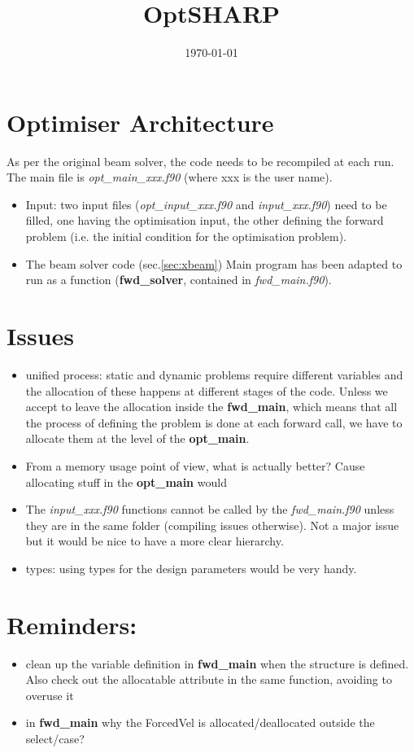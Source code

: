 \documentclass[a4paper,10pt]{article}
\title{OptSHARP}
\date{\today}
\newcommand{\bit}{\begin{itemize}}
\newcommand{\eit}{\end{itemize}}
\newcommand{\ffile}[1]{\textsl{{#1}.f90}} %
\newcommand{\ffun}[1]{\textbf{{#1}}}  %
\begin{document}
\maketitle



\section{Optimiser Architecture}
As per the original beam solver, the code needs to be recompiled at each run. The main file is \ffile{opt\_main\_xxx} (where xxx is the user name).
\bit
\item Input: two input files (\ffile{opt\_input\_xxx} and \ffile{input\_xxx}) need to be filled, one having the optimisation input, the other defining the forward problem (i.e. the initial condition for the optimisation problem).

\item The beam solver code (sec.\ref{sec:xbeam}) Main program has been adapted to run as a function (\ffun{fwd\_solver}, contained in \ffile{fwd\_main}). 


\eit



\section{Issues}
\bit
\item unified process: static and dynamic problems require different variables and the allocation of these happens at different stages of the code. Unless we accept to leave the allocation inside the \ffun{fwd\_main}, which means that all the process of defining the problem is done at each forward call, we have to allocate them at the level of the \ffun{opt\_main}.
\item From a memory usage point of view, what is actually better? Cause allocating stuff in the \ffun{opt\_main} would 
\item The \ffile{input\_xxx} functions cannot be called by the \ffile{fwd\_main} unless they are in the same folder (compiling issues otherwise). Not a major issue but it would be nice to have a more clear hierarchy.
\item types: using types for the design parameters would be very handy.
\eit


\section{Reminders:}
\bit
\item clean up the variable definition in \ffun{fwd\_main} when the structure is defined. Also check out the allocatable attribute in the same function, avoiding to overuse it
\item in \ffun{fwd\_main} why the ForcedVel is allocated/deallocated outside the select/case?
\eit
\end{document}
